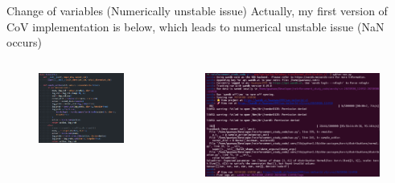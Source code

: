 \documentclass[8pt]{beamer}
\begin{document}
\begin{frame}{Change of variables (Numerically unstable issue)}
    Actually, my first version of CoV implementation is below, which leads to numerical unstable issue (NaN occurs)

    \begin{columns}
    \begin{column}{0.50\textwidth}
        \begin{figure}
            \includegraphics[width=1.0\textwidth]{UnstableCoV.png}
        \end{figure}
    \end{column}
    \begin{column}{0.57\textwidth}
        \begin{figure}
            \includegraphics[width=1.0\textwidth]{NaNError.png}
        \end{figure}
    \end{column}
    \end{columns}
\end{frame}
\end{document}
